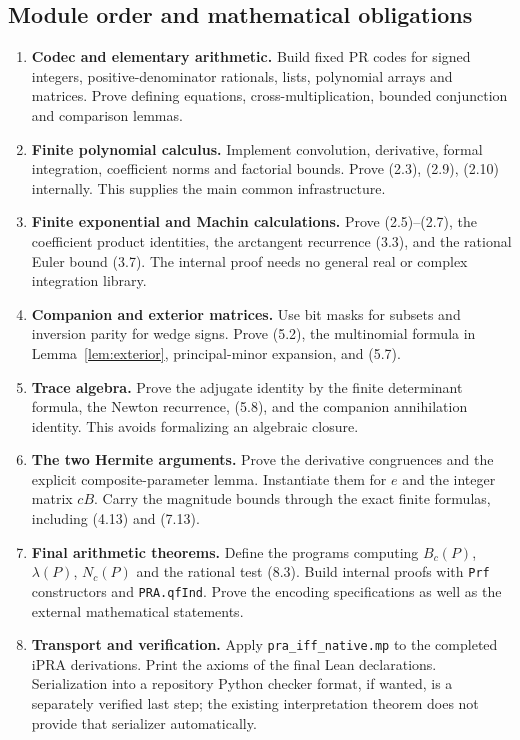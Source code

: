 \documentclass[11pt]{article}
\theoremstyle{definition}
\begin{document}
\subsection{Module order and mathematical obligations}

\begin{enumerate}
\item \textbf{Codec and elementary arithmetic.}
Build fixed PR codes for signed integers, positive-denominator rationals,
lists, polynomial arrays and matrices. Prove defining equations,
cross-multiplication, bounded conjunction and comparison lemmas.

\item \textbf{Finite polynomial calculus.}
Implement convolution, derivative, formal integration, coefficient
norms and factorial bounds. Prove (2.3), (2.9), (2.10) internally.
This supplies the main common infrastructure.

\item \textbf{Finite exponential and Machin calculations.}
Prove (2.5)--(2.7), the coefficient product identities, the arctangent
recurrence (3.3), and the rational Euler bound (3.7).
The internal proof needs no general real or complex integration library.

\item \textbf{Companion and exterior matrices.}
Use bit masks for subsets and inversion parity for wedge signs.
Prove (5.2), the multinomial formula in
Lemma~\ref{lem:exterior}, principal-minor expansion, and (5.7).

\item \textbf{Trace algebra.}
Prove the adjugate identity by the finite determinant formula, the
Newton recurrence, (5.8), and the companion annihilation identity.
This avoids formalizing an algebraic closure.

\item \textbf{The two Hermite arguments.}
Prove the derivative congruences and the explicit composite-parameter
lemma. Instantiate them for \(e\) and the integer matrix \(cB\).
Carry the magnitude bounds through the exact finite formulas,
including (4.13) and (7.13).

\item \textbf{Final arithmetic theorems.}
Define the programs computing \(B_c(P)\), \(\lambda(P)\), \(N_c(P)\)
and the rational test (8.3). Build internal proofs with
\texttt{Prf} constructors and \texttt{PRA.qfInd}. Prove the encoding
specifications as well as the external mathematical statements.

\item \textbf{Transport and verification.}
Apply \texttt{pra\_iff\_native.mp} to the completed iPRA derivations.
Print the axioms of the final Lean declarations. Serialization into a
repository Python checker format, if wanted, is a separately verified
last step; the existing interpretation theorem does not provide that
serializer automatically.
\end{enumerate}
\end{document}
